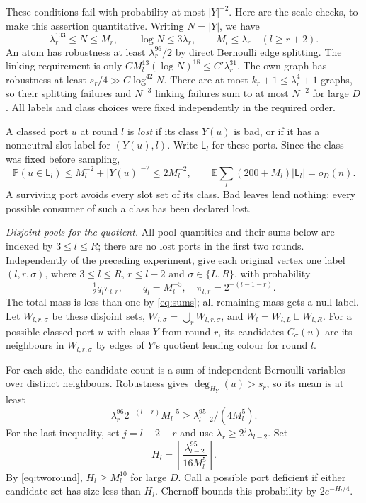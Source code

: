 \documentclass[11pt]{article}
\theoremstyle{remark}\newtheorem*{remark}{Remark}
\newcommand{\E}{\mathbb E}
\newcommand{\Prob}{\mathbb P}
\newcommand{\Lost}{\mathsf L}
\begin{document}
These conditions fail with probability at most $|Y|^{-2}$.
Here are the scale checks, to make this assertion quantitative.
Writing $N=|Y|$, we have
\[
 \lambda_r^{103}\le N\le M_r,\qquad \log N\le3\lambda_r,
 \qquad M_l\le\lambda_r\quad(l\ge r+2).
\]
An atom has robustness at least $\lambda_r^{96}/2$ by direct Bernoulli
edge splitting. The linking requirement is only
$C M_l^{13}(\log N)^{18}\le C'\lambda_r^{31}$.
The own graph has robustness at least $s_r/4\gg C\log^{42}N$.
There are at most $k_r+1\le\lambda_r^4+1$ graphs, so their splitting
failures and $N^{-3}$ linking failures sum to at most $N^{-2}$ for
large $D$. All labels and class choices were fixed independently in
the required order.

A classed port $u$ at round $l$ is \emph{lost} if its class $Y(u)$ is
bad, or if it has a nonneutral slot label for $(Y(u),l)$.
Write $\Lost_l$ for these ports. Since the class was fixed before sampling,
\begin{equation}\label{eq:lost}
 \Prob(u\in\Lost_l)\le M_l^{-2}+|Y(u)|^{-2}\le2M_l^{-2},
 \qquad \E\sum_l(200+M_l)|\Lost_l|=o_D(n).
\end{equation}
A surviving port avoids every slot set of its class. Bad leaves lend
nothing: every possible consumer of such a class has been declared lost.

\emph{Disjoint pools for the quotient.}
All pool quantities and their sums below are indexed by $3\le l\le R$;
there are no lost ports in the first two rounds.
Independently of the preceding experiment, give each original vertex
one label $(l,r,\sigma)$, where $3\le l\le R$, $r\le l-2$ and
$\sigma\in\{L,R\}$, with probability
\[
 \tfrac12q_l\pi_{l,r},\qquad q_l=M_l^{-5},\quad
 \pi_{l,r}=2^{-(l-1-r)}.
\]
The total mass is less than one by \eqref{eq:sums}; all remaining mass
gets a null label. Let $W_{l,r,\sigma}$ be these disjoint sets,
$W_{l,\sigma}=\bigcup_rW_{l,r,\sigma}$, and
$W_l=W_{l,L}\sqcup W_{l,R}$.
For a possible classed port $u$ with class $Y$ from round $r$, its
candidates $C_\sigma(u)$ are its neighbours in $W_{l,r,\sigma}$ by
edges of $Y$'s quotient lending colour for round $l$.

For each side, the candidate count is a sum of independent Bernoulli
variables over distinct neighbours. Robustness gives
$\deg_{H_Y}(u)>s_r$, so its mean is at least
\[
 \lambda_r^{96}2^{-(l-r)}M_l^{-5}
 \ge\lambda_{l-2}^{95}/(4M_l^5).
\]
For the last inequality, set $j=l-2-r$ and use
$\lambda_r\ge2^j\lambda_{l-2}$.
Set
\begin{equation}\label{eq:H}
 H_l=\left\lfloor\frac{\lambda_{l-2}^{95}}{16M_l^5}\right\rfloor.
\end{equation}
By \eqref{eq:tworound}, $H_l\ge M_l^{10}$ for large $D$.
Call a possible port deficient if either candidate set has size less
than $H_l$. Chernoff bounds this probability by $2e^{-H_l/4}$.
\end{document}
